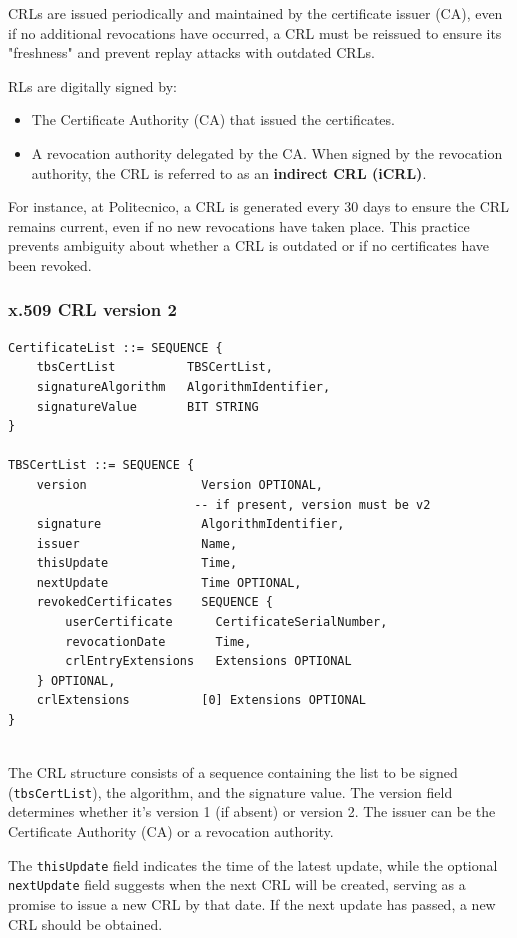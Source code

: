CRLs are issued periodically and maintained by the certificate
issuer (CA), even if no additional revocations have occurred, a
CRL must be reissued to ensure its "freshness" and prevent replay
attacks with outdated CRLs.

RLs are digitally signed by:
\begin{itemize}
  \item The Certificate Authority (CA) that issued the 
    certificates.
  \item A revocation authority delegated by the CA. When 
    signed by the revocation authority, the CRL is referred 
    to as an \textbf{indirect CRL (iCRL)}.
\end{itemize}

For instance, at Politecnico, a CRL is generated every 30 days 
to ensure the CRL remains current, even if no new revocations 
have taken place. This practice prevents ambiguity about whether 
a CRL is outdated or if no certificates have been revoked.
\subsubsection{x.509 CRL version 2}
\begin{verbatim}
CertificateList ::= SEQUENCE {
    tbsCertList          TBSCertList,
    signatureAlgorithm   AlgorithmIdentifier,
    signatureValue       BIT STRING
}

TBSCertList ::= SEQUENCE {
    version                Version OPTIONAL,
                          -- if present, version must be v2
    signature              AlgorithmIdentifier,
    issuer                 Name,
    thisUpdate             Time,
    nextUpdate             Time OPTIONAL,
    revokedCertificates    SEQUENCE {
        userCertificate      CertificateSerialNumber,
        revocationDate       Time,
        crlEntryExtensions   Extensions OPTIONAL
    } OPTIONAL,
    crlExtensions          [0] Extensions OPTIONAL
}


\end{verbatim}
The CRL structure consists of a sequence containing the list to be
signed (\texttt{tbsCertList}), the algorithm, and the signature value.
The version field determines whether it's version 1 (if absent) or
version 2. The issuer can be the Certificate Authority (CA) or a
revocation authority. 

The \texttt{thisUpdate} field indicates the time of the latest update, 
while the optional \texttt{nextUpdate} field suggests when the next CRL 
will be created, serving as a promise to issue a new CRL by that date. 
If the next update has passed, a new CRL should be obtained.

